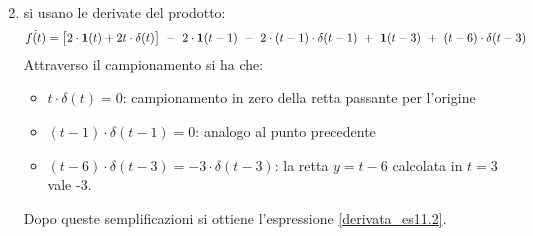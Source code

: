 \documentclass[../main.tex]{subfiles}
\begin{document}
\begin{Exercise}[title={Derivata di una funzione definita a tratti}, difficulty=3]
\begin{enumerate}
\begin{align}
					\label{derivata_es11.2}
				\end{align}
			\item si usano le derivate del prodotto:
			$$ \dot{f(t)} = \big[ 2 \cdot \gr[t] + 2t \cdot \delta(t) \big]\ -\ 2 \cdot \gr[t-1]\ -\ 2 \cdot (t-1) \cdot \delta(t-1)\ +\ \gr[t-3]\ +\ (t-6) \cdot \delta(t-3) $$
			Attraverso il campionamento si ha che:
			\begin{itemize}
				\item $ t \cdot \delta(t) = 0 $: campionamento in zero della retta passante per l'origine
				\item $ (t-1) \cdot \delta(t-1) = 0$: analogo al punto precedente
				\item $ (t-6) \cdot \delta(t-3) = - 3 \cdot \delta(t-3) $: la retta $ y=t-6 $ calcolata in $ t=3 $ vale -3. 
			\end{itemize}
			Dopo queste semplificazioni si ottiene l'espressione \ref{derivata_es11.2}.
		\end{enumerate}
	\end{Exercise}
\end{document}
